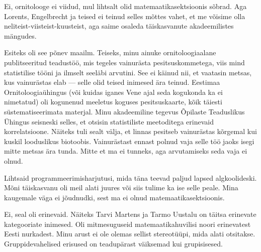 
Ei, ornitolooge ei viidud, mul lihtsalt olid matemaatikasektsioonis sõbrad. Aga 
Lorents, Engelbrecht ja teised ei teinud selles mõttes vahet, et me võisime olla 
neliteist-viisteist-kuusteist, aga saime osaleda täiskasvanute 
akadeemilistes mängudes.


Esiteks oli see põnev maailm. Teiseks, minu ainuke ornitoloogiaalane 
publitseeritud teadustöö, mis tegeles vainurästa pesitsuskommetega, viis mind statistilise tööni ja ilmselt seeläbi arvutini. See ei 
käinud nii, et vaatasin metsas, kus vainurästas elab --- selle olid 
teised inimesed ära teinud. Eestimaa Ornitoloogiaühingus (või kuidas iganes Vene ajal seda kogukonda ka ei nimetatud) oli 
kogunenud meeletus koguses pesitsuskaarte, kõik täiesti 
süstematiseerimata materjal. Minu akadeemiline tegevus Õpilaste Teaduslikus 
Ühingus seisneski selles, et otsisin statistiliste meetoditega erinevaid 
korrelatsioone. Näiteks tuli sealt välja, et linnas pesitseb vainurästas 
kõrgemal kui kuskil looduslikus biotoobis. Vainurästast ennast polnud vaja selle töö jaoks isegi mitte metsas ära tunda. Mitte 
et ma ei tunneks, aga arvutamiseks seda vaja ei olnud.


Lihtsaid programmeerimisharjutusi, mida täna teevad paljud lapsed algkoolideski. Mõni täiskasvanu oli meil alati juures või siis tulime ka ise selle peale. Mina kaugemale väga ei jõudnudki, sest ma 
ei olnud matemaatikasektsioonis.


Ei, seal oli erinevaid. Näiteks Tarvi Martens ja 
Tarmo Uustalu on täitsa erinevate kategooriate inimesed. Oli mitmesuguseid matemaatikahuvilisi noori erinevatest Eesti 
nurkadest. Minu arust ei ole olemas sellist stereotüüpi, mida alati 
otsitakse. Gruppidevahelised erisused on teadupärast väiksemad kui 
grupisisesed.



